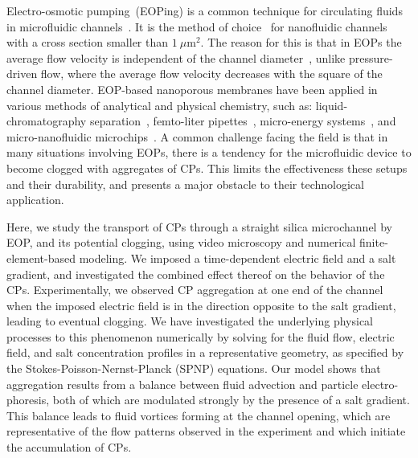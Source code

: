 \documentclass[twoside,twocolumn,9pt]{article}
\begin{document}
Electro-osmotic pumping~(EOPing) is a common technique for circulating fluids in microfluidic channels~\cite{wang_electroosmotic_2009, peng_electroosmotic_2016, han_optoelectrofluidic_2016, LI20191}. It is the method of choice~\cite{ramosAcElectrokineticsReview1998, sparreboomPrinciplesApplicationsNanofluidic2009} for nanofluidic channels with a cross section smaller than $1~\mu\mathrm{m}^2$. 
The reason for this is that in EOPs the average flow velocity is independent of the channel diameter~\cite{hunterFoundationsColloidScience2001, Tallarek_2000}, unlike pressure-driven flow, where the average flow velocity decreases with the square of the channel diameter. 
EOP-based nanoporous membranes have been applied in various methods of analytical and physical chemistry, such as: liquid-chromatography separation~\cite{Xiong_yuan_Anvanced_2017}, femto-liter pipettes~\cite{Apeng_Femto_liter_2017}, micro-energy systems~\cite{Kilsung_micropower_2012}, and micro-nanofluidic microchips~\cite{yangLowvoltageEfficientElectroosmotic2019}. 
A common challenge facing the field is that in many situations involving EOPs, there is a tendency for the microfluidic device to become clogged with aggregates of CPs. 
This limits the effectiveness these setups and their durability, and presents a major obstacle to their technological application.

Here, we study the transport of CPs through a straight silica microchannel by EOP, and its potential clogging, using video microscopy and numerical finite-element-based modeling. 
We imposed a time-dependent electric field and a salt gradient, and investigated the combined effect thereof on the behavior of the CPs. 
Experimentally, we observed CP aggregation at one end of the channel when the imposed electric field is in the direction opposite to the salt gradient, leading to eventual clogging. 
We have investigated the underlying physical processes to this phenomenon numerically by solving for the fluid flow, electric field, and salt concentration profiles in a representative geometry, as specified by the Stokes-Poisson-Nernst-Planck (SPNP) equations. 
Our model shows that aggregation results from a balance between fluid advection and particle electro-phoresis, both of which are modulated strongly by the presence of a salt gradient. 
This balance leads to fluid vortices forming at the channel opening, which are representative of the flow patterns observed in the experiment and which initiate the accumulation of CPs.
\end{document}
